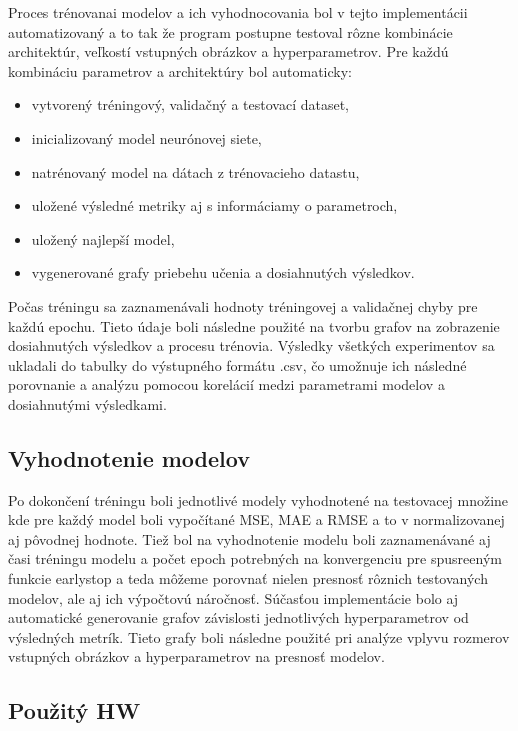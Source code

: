 Proces trénovanai modelov a ich vyhodnocovania bol v tejto implementácii automatizovaný a to tak že program postupne testoval rôzne kombinácie architektúr, veľkostí vstupných obrázkov a hyperparametrov. Pre každú kombináciu parametrov a architektúry bol automaticky:
\begin{itemize}[nolistsep, noitemsep]
    \item vytvorený tréningový, validačný a testovací dataset,
    \item inicializovaný model neurónovej siete,
    \item natrénovaný model na dátach z trénovacieho datastu,
    \item uložené výsledné metriky aj s informáciamy o parametroch,
    \item uložený najlepší model,
    \item vygenerované grafy priebehu učenia a dosiahnutých výsledkov.
\end{itemize}

Počas tréningu sa zaznamenávali hodnoty tréningovej a validačnej chyby pre každú epochu.  Tieto údaje boli následne použité na tvorbu grafov na zobrazenie dosiahnutých výsledkov a procesu trénovia. Výsledky všetkých experimentov sa ukladali do tabulky do výstupného formátu .csv, čo umožnuje ich následné porovnanie a analýzu pomocou korelácií medzi parametrami modelov a dosiahnutými výsledkami.



\vspace{\baselineskip}
\subsection{Vyhodnotenie modelov}

Po dokončení tréningu boli jednotlivé modely vyhodnotené na testovacej množine kde pre každý model boli vypočítané MSE, MAE a RMSE a to v normalizovanej aj pôvodnej hodnote. Tiež bol na vyhodnotenie modelu boli zaznamenávané aj časi tréningu modelu a počet epoch potrebných na konvergenciu pre spusreeným funkcie earlystop a teda môžeme porovnať nielen presnosť rôznich testovaných modelov, ale aj ich výpočtovú náročnosť. Súčasťou implementácie bolo aj automatické generovanie grafov závislosti jednotlivých hyperparametrov od výsledných metrík. Tieto grafy boli následne použité pri analýze vplyvu rozmerov vstupných obrázkov a hyperparametrov na presnosť modelov.


\vspace{\baselineskip}
\subsection{Použitý HW}

